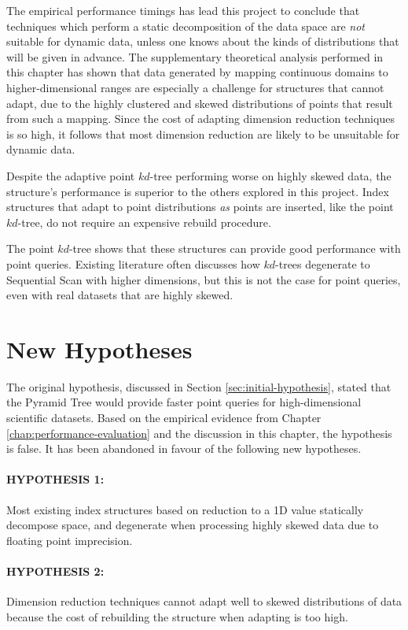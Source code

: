The empirical performance timings has lead this project to conclude that techniques which perform a static decomposition of the data space are \textit{not} suitable for dynamic data, unless one knows about the kinds of distributions that will be given in advance. The supplementary theoretical analysis performed in this chapter has shown that data generated by mapping continuous domains to higher-dimensional ranges are especially a challenge for structures that cannot adapt, due to the highly clustered and skewed distributions of points that result from such a mapping. Since the cost of adapting dimension reduction techniques is so high, it follows that most dimension reduction are likely to be unsuitable for dynamic data.

Despite the adaptive point $kd$-tree performing worse on highly skewed data, the structure's performance is superior to the others explored in this project. Index structures that adapt to point distributions \textit{as} points are inserted, like the point $kd$-tree, do not require an expensive rebuild procedure.

The point $kd$-tree shows that these structures can provide good performance with point queries. Existing literature often discusses how $kd$-trees degenerate to Sequential Scan with higher dimensions, but this is not the case for point queries, even with real datasets that are highly skewed.

\section{New Hypotheses}

The original hypothesis, discussed in Section \ref{sec:initial-hypothesis}, stated that the Pyramid Tree would provide faster point queries for high-dimensional scientific datasets. Based on the empirical evidence from Chapter \ref{chap:performance-evaluation} and the discussion in this chapter, the hypothesis is false. It has been abandoned in favour of the following new hypotheses.

\paragraph{\textbf{HYPOTHESIS 1:}} Most existing index structures based on reduction to a 1D value statically decompose space, and degenerate when processing highly skewed data due to floating point imprecision.

\paragraph{\textbf{HYPOTHESIS 2:}} Dimension reduction techniques cannot adapt well to skewed distributions of data because the cost of rebuilding the structure when adapting is too high.

